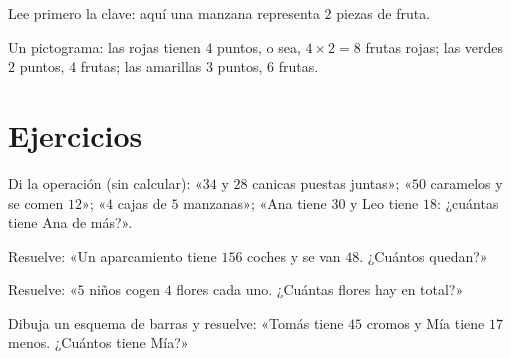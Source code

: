 \begin{example}[Un pictograma]\label{ex:g2:problems:pictogram}
Lee primero la clave: aquí una manzana representa $2$ piezas de fruta.

\begin{omfigure}

{\small Un pictograma: las rojas tienen $4$ puntos, o sea, $4 \times 2 = 8$ frutas
rojas; las verdes $2$ puntos, $4$ frutas; las amarillas $3$ puntos, $6$ frutas.}
\end{omfigure}
\end{example}

\section{Ejercicios}

\begin{exercise}[$\star$]\label{exo:g2:problems:1}
Di la operación (sin calcular): «$34$ y $28$ canicas puestas
juntas»; «$50$ caramelos y se comen $12$»; «$4$ cajas de $5$
manzanas»; «Ana tiene $30$ y Leo tiene $18$: ¿cuántas tiene Ana de más?».
\end{exercise}

\begin{exercise}[$\star$]\label{exo:g2:problems:2}
Resuelve: «Un aparcamiento tiene $156$ coches y se van $48$. ¿Cuántos quedan?»
\end{exercise}

\begin{exercise}[$\star$]\label{exo:g2:problems:3}
Resuelve: «$5$ niños cogen $4$ flores cada uno. ¿Cuántas flores hay en
total?»
\end{exercise}

\begin{exercise}[$\star$]\label{exo:g2:problems:4}
Dibuja un esquema de barras y resuelve: «Tomás tiene $45$ cromos y Mía tiene $17$
menos. ¿Cuántos tiene Mía?»
\end{exercise}

